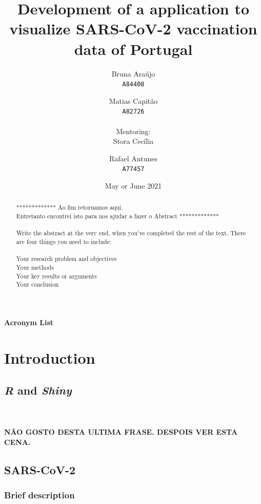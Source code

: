 \documentclass[11pt,a4paper]{report}
\title{Development of a \Shiny application to visualize SARS-CoV-2 vaccination data of Portugal}
\author{
  Bruna Araújo\\
  \texttt{A84408}
  \and
  Matias Capitão\\
  \texttt{A82726} \\ 
  \\ Mentoring:\\
  Stora Cecília \\
  \and
  Rafael Antunes\\
  \texttt{A77457}
}
\date{May or June 2021}
\def\R{{\textsl{R }}}
\def\Shiny{\textsl{Shiny }}
\begin{document}
\maketitle

\begin{abstract}
    ************* Ao fim retornamos aqui.\\ Entretanto encontrei isto para nos ajudar a fazer o Abstract *************\\ \\
    Write the abstract at the very end, when you’ve completed the rest of the text. There are four things you need to include:\\ \\

    Your research problem and objectives\\
    Your methods\\
    Your key results or arguments\\
    Your conclusion

\end{abstract}

\tableofcontents
\newpage

\listoffigures
\newpage

\listoftables
\newpage

{\huge\textbf{Acronym List}}\\



\chapter{Introduction}
\section{\R and \Shiny}



\\
\\
\textbf{NÃO GOSTO DESTA ULTIMA FRASE. DESPOIS VER ESTA CENA.}


\section{SARS-CoV-2}
\subsection{Brief description}
\end{document}

